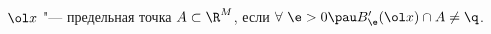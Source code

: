 
	 $\ol x$ "--- предельная точка $A\subset \R^M$, если $\forall\ \e>0\pau B'_\e(\ol x)\cap A \neq \q$.
	 